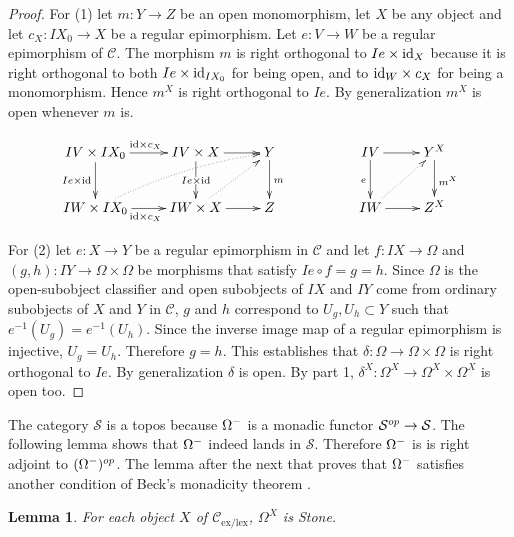 \documentclass[sort&compress]{elsarticle}
\theoremstyle{plain}
\newtheorem{lemma}[theorem]{Lemma}
\theoremstyle{definition}
\theoremstyle{remark}
\newcommand\cat\mathcal
\newcommand\exlex{_\mathrm{ex/lex}}
\begin{document}
\begin{proof} For (1) let $m:Y\to Z$ be an open monomorphism, let $X$ be any object and let $c_X:IX_0 \to X$ be a regular epimorphism. Let $e:V\to W$ be a regular epimorphism of $\cat C$. The morphism $m$ is right orthogonal to $Ie\times \mathrm{id}_X$ because it is right orthogonal to both $Ie\times \mathrm{id}_{IX_0}$ for being open, and to $\mathrm{id}_{W}\times c_X$ for being a monomorphism. Hence $m^X$ is right orthogonal to $Ie$. By generalization $m^X$ is open whenever $m$ is.

\[\xymatrix{
IV\times IX_0 \ar[d]_{Ie\times \id} \ar[r]^{\id\times c_X} & IV\times X \ar[r] \ar[d]|{Ie\times \id} & Y\ar[d]^m && IV \ar[d]_e\ar[r] & Y^X \ar[d]^{m^X} \\
IW\times IX_0 \ar[r]_{\id\times c_X}\ar@{.>}@/^/[urr] & IW\times X \ar[r]\ar@{.>}[ur] & Z && IW\ar[r]\ar@{.>}[ur] & Z^X
}\]

For (2) let $e:X\to Y$ be a regular epimorphism in $\cat C$ and let $f:IX\to \Omega$ and $(g,h):IY\to \Omega\times \Omega$ be morphisms that satisfy $Ie\circ f = g = h$. Since $\Omega$ is the open-subobject classifier and open subobjects of $IX$ and $IY$ come from ordinary subobjects of $X$ and $Y$ in $\cat C$, $g$ and $h$ correspond to $U_g,U_h\subset Y$ such that $e^{-1}(U_g) = e^{-1}(U_h)$. Since the inverse image map of a regular epimorphism is injective, $U_g=U_h$. Therefore $g=h$. This establishes that $\delta:\Omega\to \Omega\times \Omega$ is right orthogonal to $Ie$. By generalization $\delta$ is open. By part 1, $\delta^X: \Omega^X \to \Omega^X\times \Omega^X$ is open too.
\end{proof}

The category $\cat S$ is a topos because $\Omega^-$ is a monadic functor $\cat S\dual\to\cat S$. The following lemma shows that $\Omega^-$ indeed lands in $\cat S$. Therefore $\Omega^-$ is is right adjoint to $(\Omega^-)^{op}$. The lemma after the next that proves that $\Omega^-$ satisfies another condition of Beck's monadicity theorem \citep[VI.7]{MR0354798}.


\begin{lemma} For each object $X$ of $\cat C\exlex$, $\Omega^X$ is Stone.\end{lemma}
\end{document}
